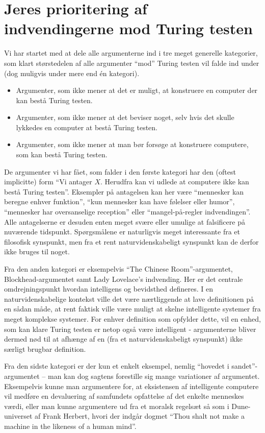 \section{Jeres prioritering af indvendingerne mod Turing testen}
Vi har startet med at dele alle argumenterne ind i tre meget generelle
kategorier, som klart størstedelen af alle argumenter ``mod'' Turing testen vil
falde ind under (dog muligvis under mere end én kategori).

\begin{itemize}
\item Argumenter, som ikke mener at det er muligt, at konstruere en computer der
kan bestå Turing testen.
\item Argumenter, som ikke mener at det beviser noget, selv hvis det skulle
lykkedes en computer at bestå Turing testen.
\item Argumenter, som ikke mener at man bør forsøge at konstruere computere, som
kan bestå Turing testen.
\end{itemize}

De argumenter vi har fået, som falder i den første kategori har den (oftest
implicitte) form ``Vi antager $X$. Herudfra kan vi udlede at computere ikke
kan bestå Turing testen''. Eksempler på antagelsen kan her være ``mennesker
kan beregne enhver funktion'', ``kun mennesker kan have følelser eller
humor'', ``mennesker har oversanselige reception'' eller ``mangel-på-regler
indvendingen''. Alle antagelserne er desuden enten meget svære eller umulige
at falsificere på nuværende tidspunkt. Spørgsmålene er naturligvis meget
interessante fra et filosofisk synspunkt, men fra et rent naturvidenskabeligt
synspunkt kan de derfor ikke bruges til noget.

Fra den anden kategori er eksempelvis ``The Chinese Room''-argumentet,
Blockhead-argumentet samt Lady Lovelace's indvending. Her er det centrale
omdrejningspunkt hvordan intelligens og bevidsthed defineres. I en
naturvidenskabelige kontekst ville det være nærtliggende at lave definitionen på
en sådan måde, at rent faktisk ville være muligt at skelne intelligente systemer
fra meget komplekse systemer. For enhver definition som opfylder dette, vil en
enhed, som kan klare Turing testen er netop også være intelligent - argumenterne
bliver dermed nød til at afhænge af en (fra et naturvidenskabeligt synspunkt)
ikke særligt brugbar definition.

Fra den sidste kategori er der kun et enkelt eksempel, nemlig ``hovedet i
sandet''-argumentet -- man kan dog sagtens forestille sig mange variationer af
argumentet. Eksempelvis kunne man argumentere for, at eksistensen af
intelligente computere vil medføre en devaluering af samfundets opfattelse af
det enkelte menneskes værdi, eller man kunne argumentere ud fra et moralsk
regelsæt så som i Dune-universet af Frank Herbert, hvori der indgår dogmet
``Thou shalt not make a machine in the likeness of a human mind''.

